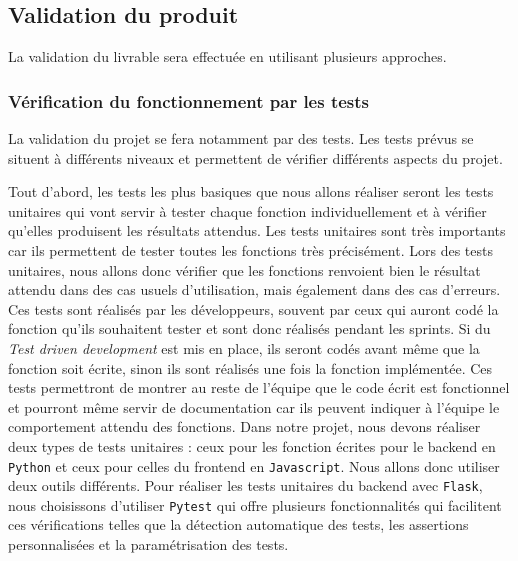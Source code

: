 \documentclass{article}
\begin{document}
\subsection{Validation du produit} \label{sec:validation}
La validation du livrable sera effectuée en utilisant plusieurs approches.
\subsubsection{Vérification du fonctionnement par les tests}
La validation du projet se fera notamment par des tests. Les tests prévus se situent à différents niveaux et permettent de vérifier différents
aspects du projet.

Tout d'abord, les tests les plus basiques que nous allons réaliser seront les tests unitaires qui vont servir à tester chaque fonction individuellement et à vérifier qu'elles produisent les résultats attendus.
Les tests unitaires sont très importants car ils permettent de tester toutes les fonctions très précisément.
Lors des tests unitaires, nous allons donc vérifier que les fonctions renvoient bien le résultat attendu dans des cas usuels d'utilisation, mais
également dans des cas d'erreurs. Ces tests sont réalisés par les développeurs, souvent par ceux qui auront codé la fonction qu'ils souhaitent tester et sont donc réalisés pendant les sprints. Si du \textit{Test driven development} est mis en place, ils seront codés avant même que la fonction soit écrite, sinon 
ils sont réalisés une fois la fonction implémentée. Ces tests permettront de montrer au reste de l'équipe que le code écrit est fonctionnel et pourront même servir de documentation
car ils peuvent indiquer à l'équipe le comportement attendu des fonctions. 
Dans notre projet, nous devons réaliser deux types de tests unitaires : ceux pour les fonction écrites pour le backend en \texttt{Python} et ceux pour celles du frontend en \texttt{Javascript}. Nous allons donc utiliser deux outils différents.
Pour réaliser les tests unitaires du backend avec \texttt{Flask}, nous choisissons d'utiliser \texttt{Pytest} qui offre plusieurs fonctionnalités qui facilitent ces vérifications telles que la détection automatique des tests, les assertions personnalisées et la paramétrisation des tests. 
\end{document}
